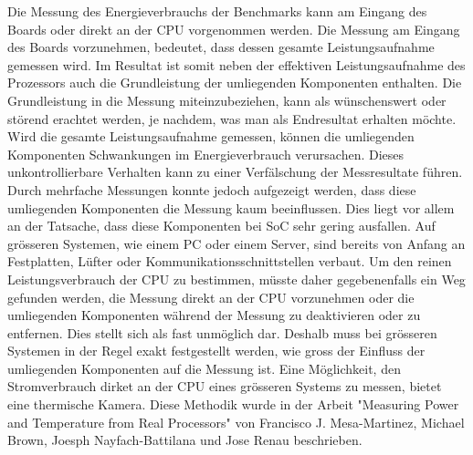 Die Messung des Energieverbrauchs der Benchmarks kann am Eingang des Boards oder direkt an der CPU vorgenommen werden. Die Messung am Eingang des Boards vorzunehmen, bedeutet, dass dessen gesamte Leistungsaufnahme gemessen wird. Im Resultat ist somit neben der effektiven Leistungsaufnahme des Prozessors auch die Grundleistung der umliegenden Komponenten enthalten. Die Grundleistung in die Messung miteinzubeziehen, kann als wünschenswert oder störend erachtet werden, je nachdem, was man als Endresultat erhalten möchte. Wird die gesamte Leistungsaufnahme gemessen, können die umliegenden Komponenten Schwankungen im Energieverbrauch verursachen. Dieses unkontrollierbare Verhalten kann zu einer Verfälschung der Messresultate führen. Durch mehrfache Messungen konnte jedoch aufgezeigt werden, dass diese umliegenden Komponenten die Messung kaum beeinflussen. Dies liegt vor allem an der Tatsache, dass diese Komponenten bei SoC sehr gering ausfallen. Auf grösseren Systemen, wie einem PC oder einem Server, sind bereits von Anfang an Festplatten, Lüfter oder Kommunikationsschnittstellen verbaut. Um den reinen Leistungsverbrauch der CPU zu bestimmen, müsste daher gegebenenfalls ein Weg gefunden werden, die Messung direkt an der CPU vorzunehmen oder die umliegenden Komponenten während der Messung zu deaktivieren oder zu entfernen. Dies stellt sich als fast unmöglich dar. Deshalb muss bei grösseren Systemen in der Regel exakt festgestellt werden, wie gross der Einfluss der umliegenden Komponenten auf die Messung ist. Eine Möglichkeit, den Stromverbrauch dirket an der CPU eines grösseren Systems zu messen, bietet eine thermische Kamera. Diese Methodik wurde in der Arbeit "Measuring Power and Temperature from Real Processors"\cite{measuring_power_temperature} von Francisco J. Mesa-Martinez, Michael Brown, Joesph Nayfach-Battilana und Jose Renau beschrieben.


